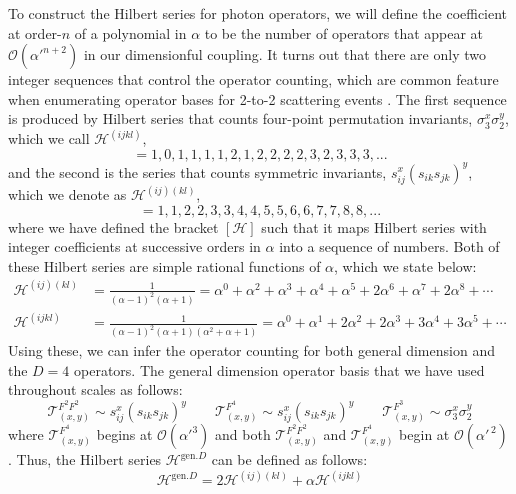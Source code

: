 \documentclass[11pt,letter]{article}
\begin{document}
To construct the Hilbert series for photon operators, we will define the coefficient at order-$n$ of a polynomial in $\alpha$ to be the number of operators that appear at $\mathcal{O}(\alpha'^{n+2})$ in our dimensionful coupling. It turns out that there are only two integer sequences that control the operator counting, which are common feature when enumerating operator bases for 2-to-2 scattering events \cite{Damgaard:2019lfh,Haddad:2020que,Bern:2020uwk,Balkin:2021dko,Liu:2023jbq,Haddad:2023ylx}. The first sequence is produced by Hilbert series that counts four-point {permutation invariants}, $\sigma_3^x \sigma_2^y$, which we call $\mathcal{H}^{(ijkl)}$, 
\begin{equation}
[\mathcal{H}^{(ijkl)}] = 1,0,1,1,1,1,2,1,2,2,2,2,3,2,3,3,3,...
\end{equation}
and the second is the series that counts {symmetric invariants}, $s_{ij}^x(s_{ik}s_{jk})^y$, which we denote as $\mathcal{H}^{(ij)(kl)}$,
\begin{equation}
[\mathcal{H}^{(ij)(kl)}] = 1,1,2,2,3,3,4,4,5,5,6,6,7,7,8,8,...
\end{equation}
where we have defined the bracket $[\mathcal{H}]$ such that it maps Hilbert series with integer coefficients at successive orders in $\alpha$ into a sequence of numbers. Both of these Hilbert series are simple rational functions of $\alpha$, which we state below:
\begin{align}
\mathcal{H}^{(ij)(kl)} &= \frac{1}{(\alpha-1)^2(\alpha+1)} = \alpha^0+\alpha^2+\alpha^3+\alpha^4+\alpha^5+2\alpha^6+\alpha^7+2\alpha^8+\cdots
\\
\mathcal{H}^{(ijkl)} &= \frac{1}{(\alpha-1)^2(\alpha+1)(\alpha^2+\alpha+1)} = \alpha^0+\alpha^1+2\alpha^2+2\alpha^3+3\alpha^4+3\alpha^5+\cdots
\end{align}
Using these, we can infer the operator counting for both general dimension and the $D=4$ operators. The general dimension operator basis that we have used throughout scales as follows:
\begin{equation}
\mathcal{T}^{F^2F^2}_{(x,y)} \sim s_{ij}^x(s_{ik}s_{jk})^y \qquad \mathcal{T}^{F^4}_{(x,y)} \sim s_{ij}^x(s_{ik}s_{jk})^y \qquad \mathcal{T}^{F^3}_{(x,y)} \sim \sigma_3^x\sigma_2^y
\end{equation}
where $\mathcal{T}^{F^4}_{(x,y)}$ begins at $\mathcal{O}(\alpha'^3)$ and both $\mathcal{T}^{F^2F^2}_{(x,y)}$ and $\mathcal{T}^{F^4}_{(x,y)} $ begin at $\mathcal{O}(\alpha'^{\,2})$. Thus, the Hilbert series $\mathcal{H}^{\text{gen.}D}$ can be defined as follows:
\begin{equation}
\mathcal{H}^{\text{gen.}D} = 2\mathcal{H}^{(ij)(kl)} + \alpha \mathcal{H}^{(ijkl)} 
\end{equation}
\end{document}
